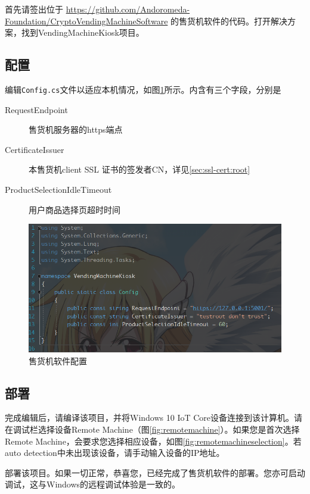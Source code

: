 \documentclass[a4paper,11pt]{article}
\theoremstyle{definition}
\begin{document}
首先请签出位于
\url{https://github.com/Andoromeda-Foundation/CryptoVendingMachineSoftware} 的售货机软件的代码。打开解决方案，找到VendingMachineKiosk项目。

\subsection{配置}\label{sec:vm-soft-config}

编辑\verb|Config.cs|文件以适应本机情况，如图\ref{fig:kioskconfig}所示。内含有三个字段，分别是
\begin{description}
  \item[RequestEndpoint] 售货机服务器的https端点
  \item[CertificateIssuer] 本售货机client SSL 证书的签发者CN，详见\ref{sec:ssl-cert:root}
  \item[ProductSelectionIdleTimeout] 用户商品选择页超时时间
\end{description}

    \begin{figure}[htbp]
    \minipage[b][][b]{\textwidth}
        \includegraphics[width=\linewidth]{kioskconfig.png}
        \caption{售货机软件配置}
        \label{fig:kioskconfig}
    \endminipage\hfill
    \end{figure}

\subsection{部署}

完成编辑后，请编译该项目，并将Windows 10 IoT Core设备连接到该计算机。请在调试栏选择设备Remote Machine（图\ref{fig:remotemachine}）。如果您是首次选择Remote Machine，会要求您选择相应设备，如图\ref{fig:remotemachineselection}。若auto detection中未出现该设备，请手动输入设备的IP地址。

部署该项目。如果一切正常，恭喜您，已经完成了售货机软件的部署。您亦可启动调试，这与Windows的远程调试体验是一致的。
\end{document}
